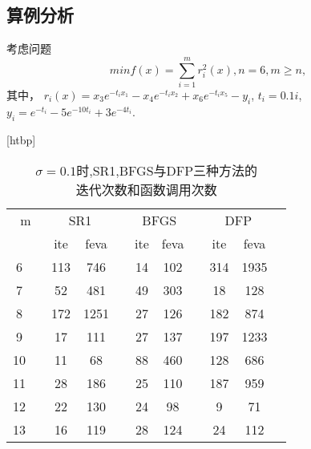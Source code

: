         \subsection{算例分析}
            \begin{example}\label{nndfl}
                考虑问题
                \begin{equation}
                    min f(x) = \sum^m_{i=1}r_i^2(x), n=6,m\geq n,
                \end{equation}
                    其中，
                    $r_i(x)=x_3e^{-t_ix_1}-x_4e^{-t_ix_2}+x_6e^{-t_ix_5}-y_i$,
                    $t_i=0.1i$,
                    $y_i=e^{-t_i}-5e^{-10t_i}+3e^{-4t_i}$.
                
                \begin{table}\label{nndf1}[htbp]\center
                    \caption{$\sigma = 0.1$时,SR1,BFGS与DFP三种方法的
                            \\迭代次数和函数调用次数}
                    \begin{tabular}{cccccccccccc}
                    \toprule %
                        \multicolumn{3}{c}{m}& 
                        \multicolumn{2}{c}{SR1}&&                  \multicolumn{2}{c}{BFGS}&&                 \multicolumn{2}{c}{DFP}&\\
                    \cmidrule(lr){4-12}
                        \multicolumn{2}{c}{}&&ite&feva&&ite&feva&&ite&feva&\\  %
                    \hline %
                        \multicolumn{2}{c}{6} & &113&746 & &14&102& &314&1935& \\
                        \multicolumn{2}{c}{7} & &52 &481 & &49&303& &18 &128 & \\
                        \multicolumn{2}{c}{8} & &172&1251& &27&126& &182&874 & \\
                        \multicolumn{2}{c}{9} & &17 &111 & &27&137& &197&1233& \\
                        \multicolumn{2}{c}{10}& &11 &68  & &88&460& &128&686 & \\
                        \multicolumn{2}{c}{11}& &28 &186 & &25&110& &187&959 & \\
                        \multicolumn{2}{c}{12}& &22 &130 & &24&98 & &9  &71  & \\
                        \multicolumn{2}{c}{13}& &16 &119 & &28&124& &24 &112 & \\
                    \bottomrule %
                    \end{tabular}
                    \label{tableExample1}
                \end{table}
                

\end{example}
